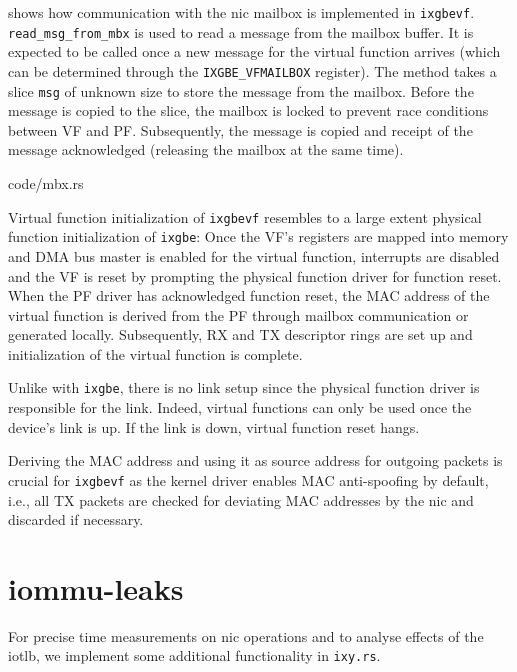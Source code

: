  shows how communication with the \ac{nic} mailbox is
implemented in \texttt{ixgbevf}. \linebreak \texttt{read\_msg\_from\_mbx} is
used to read a message from the mailbox buffer. It is expected to be called once
a new message for the virtual function arrives (which can be determined through
the \texttt{IXGBE\_VFMAILBOX} register). The method takes a slice \texttt{msg}
of unknown size to store the message from the mailbox. Before the message is
copied to the slice, the mailbox is locked to prevent race conditions between VF
and PF. Subsequently, the message is copied and receipt of the message
acknowledged (releasing the mailbox at the same time).

\begin{minipage}{\textwidth}
     {code/mbx.rs}
\end{minipage}

Virtual function initialization of \texttt{ixgbevf} resembles to a large extent
physical function initialization of \texttt{ixgbe}: Once the VF's registers are
mapped into memory and DMA bus master is enabled for the virtual function,
interrupts are disabled and the VF is reset by prompting the physical function
driver for function reset. When the PF driver has acknowledged function reset,
the MAC address of the virtual function is derived from the PF through mailbox
communication or generated locally. Subsequently, RX and TX descriptor rings are
set up and initialization of the virtual function is complete.

Unlike with \texttt{ixgbe}, there is no link setup since the physical function
driver is responsible for the link. Indeed, virtual functions can only be used
once the device's link is up. If the link is down, virtual function reset hangs.

Deriving the MAC address and using it as source address for outgoing packets is
crucial for \texttt{ixgbevf} as the kernel driver enables MAC anti-spoofing by
default, i.e., all TX packets are checked for deviating MAC addresses by the
\ac{nic} and discarded if necessary.


\section{iommu-leaks}
\label{sec:iommu_leaks}

For precise time measurements on \ac{nic} operations and to analyse effects of
the \ac{iotlb}, we implement some additional functionality in \texttt{ixy.rs}.

